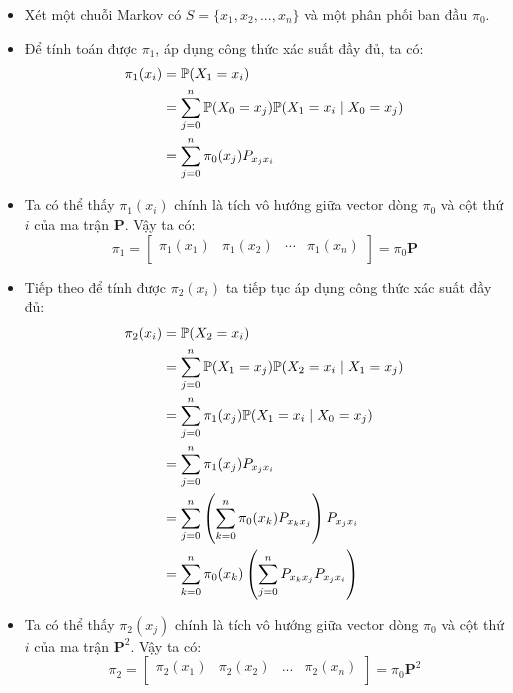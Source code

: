 \begin{itemize}
    \item Xét một chuỗi Markov có $S = \{x_1, x_2, ..., x_n\}$ và một phân phối ban đầu $\pi_0$. 

    \item Để tính toán được $\pi_1$, áp dụng công thức xác suất đầy đủ, ta có:
    $$
    \begin{aligned}
    \pi_1(x_i) &= \P(X_1 = x_i) \\ 
    &= \sum_{j = 0}^{n} \P(X_0 = x_j)\P(X_1  = x_i \mid X_0 = x_j) \\
    &= \sum_{j = 0}^{n} \pi_0(x_j) P_{x_jx_i}
    \end{aligned}
    $$

    \item Ta có thể thấy $\pi_1(x_i)$ chính là tích vô hướng giữa vector dòng $\pi_0$ và cột thứ $i$ của ma trận $\mathbf{P}$. Vậy ta có:
    $$
    \pi_1 = \begin{bmatrix}
        \pi_1(x_1) & \pi_1(x_2) & \dotsb & \pi_1(x_n) \\
    \end{bmatrix} = \pi_0 \mathbf{P}
    $$

    \item Tiếp theo để tính được $\pi_2(x_i)$ ta tiếp tục áp dụng công thức xác suất đầy đủ:
    $$
    \begin{aligned}
    \pi_2(x_i) &= \P(X_2 = x_i) \\
    &= \sum_{j=0}^{n} \P(X_1 = x_j) \P(X_2 = x_i \mid X_1 = x_j) \\
    &= \sum_{j=0}^{n} \pi_1(x_j) \P(X_1 = x_i \mid X_0 = x_j) \\
    &= \sum_{j=0}^{n} \pi_1(x_j) P_{x_jx_i} \\
    &= \sum_{j=0}^{n} \left( \sum_{k=0}^{n} \pi_0(x_k) P_{x_kx_j} \right) P_{x_jx_i} \\
    &= \sum_{k=0}^{n} \pi_0(x_k) \left( \sum_{j = 0}^n P_{x_kx_j} P_{x_jx_i} \right)
    \end{aligned}
    $$

    \item Ta có thể thấy $\pi_2(x_j)$ chính là tích vô hướng giữa vector dòng $\pi_0$ và cột thứ $i$ của ma trận $\mathbf{P}^2$. Vậy ta có:
    $$
    \pi_2 = \begin{bmatrix}
        \pi_2(x_1) & \pi_2(x_2) & ... & \pi_2(x_n) \\
    \end{bmatrix} = \pi_0 \mathbf{P}^2
    $$


\end{itemize}
